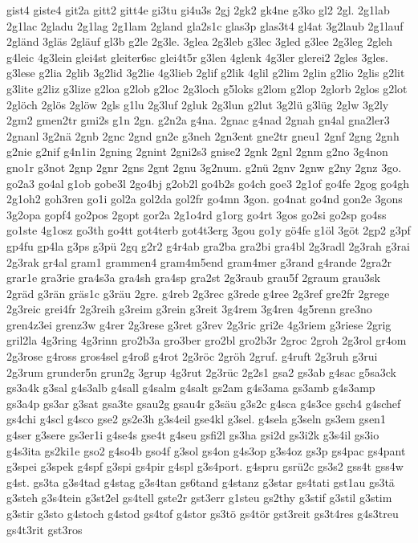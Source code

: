 {gist4
giste4
git2a
gitt2
gitt4e
gi3tu
gi4u3s
2gj
2gk2
gk4ne
g3ko
gl2
2gl.
2g1lab
2g1lac
2gladu
2g1lag
2g1lam
2gland
gla2s1c
glas3p
glas3t4
gl4at
3g2laub
2g1lauf
2gländ
3gläs
2gläuf
gl3b
g2le
2g3le.
3glea
2g3leb
g3lec
3gled
g3lee
2g3leg
2gleh
g4leic
4g3lein
glei4st
gleiter6sc
glei4t5r
g3len
4glenk
4g3ler
glerei2
2gles
3gles.
g3lese
g2lia
2glib
3g2lid
3g2lie
4g3lieb
2glif
g2lik
4glil
g2lim
2glin
g2lio
2glis
g2lit
g3lite
g2liz
g3lize
g2loa
g2lob
g2loc
2g3loch
g5loks
g2lom
g2lop
2glorb
2glos
g2lot
2glöch
2glös
2glöw
2gls
g1lu
2g3luf
2gluk
2g3lun
g2lut
3g2lü
g3lüg
2glw
3g2ly
2gm2
gmen2tr
gmi2s
g1n
2gn.
g2n2a
g4na.
2gnac
g4nad
2gnah
gn4al
gna2ler3
2gnanl
3g2nä
2gnb
2gnc
2gnd
gn2e
g3neh
2gn3ent
gne2tr
gneu1
2gnf
2gng
2gnh
g2nie
g2nif
g4n1in
2gning
2gnint
2gni2s3
gnise2
2gnk
2gnl
2gnm
g2no
3g4non
gno1r
g3not
2gnp
2gnr
2gns
2gnt
2gnu
3g2num.
g2nü
2gnv
2gnw
g2ny
2gnz
3go.
go2a3
go4al
g1ob
gobe3l
2go4bj
g2ob2l
go4b2s
go4ch
goe3
2g1of
go4fe
2gog
go4gh
2g1oh2
goh3ren
go1i
gol2a
gol2da
gol2fr
go4mn
3gon.
go4nat
go4nd
gon2e
3gons
3g2opa
gopf4
go2pos
2gopt
gor2a
2g1o4rd
g1org
go4rt
3gos
go2si
go2sp
go4ss
go1ste
4g1osz
go3th
go4tt
got4terb
got4t3erg
3gou
go1y
gö4fe
g1öl
3göt
2gp2
g3pf
gp4fu
gp4la
g3ps
g3pü
2gq
g2r2
g4r4ab
gra2ba
gra2bi
gra4bl
2g3radl
2g3rah
g3rai
2g3rak
gr4al
gram1
grammen4
gram4m5end
gram4mer
g3rand
g4rande
2gra2r
grar1e
gra3rie
gra4s3a
gra4sh
gra4sp
gra2st
2g3raub
grau5f
2graum
grau3sk
2gräd
g3rän
gräs1c
g3räu
2gre.
g4reb
2g3rec
g3rede
g4ree
2g3ref
gre2fr
2grege
2g3reic
grei4fr
2g3reih
g3reim
g3rein
g3reit
3g4rem
3g4ren
4g5renn
gre3no
gren4z3ei
grenz3w
g4rer
2g3rese
g3ret
g3rev
2g3ric
gri2e
4g3riem
g3riese
2grig
gril2la
4g3ring
4g3rinn
gro2b3a
gro3ber
gro2bl
gro2b3r
2groc
2groh
2g3rol
gr4om
2g3rose
g4ross
gros4sel
g4roß
g4rot
2g3röc
2gröh
2gruf.
g4ruft
2g3ruh
g3rui
2g3rum
grunder5n
grun2g
3grup
4g3rut
2g3rüc
2g2s1
gsa2
gs3ab
g4sac
g5sa3ck
gs3a4k
g3sal
g4s3alb
g4sall
g4salm
g4salt
gs2am
g4s3ama
gs3amb
g4s3amp
gs3a4p
gs3ar
g3sat
gsa3te
gsau2g
gsau4r
g3säu
g3s2c
g4sca
g4s3ce
gsch4
g4schef
gs4chi
g4scl
g4sco
gse2
gs2e3h
g3s4eil
gse4kl
g3sel.
g4sela
g3seln
gs3em
gsen1
g4ser
g3sere
gs3er1i
g4se4s
gse4t
g4seu
gsfi2l
gs3ha
gsi2d
gs3i2k
g3s4il
gs3io
g4s3ita
gs2ki1e
gso2
g4so4b
gso4f
g3sol
gs4on
g4s3op
g3s4oz
gs3p
gs4pac
gs4pant
g3spei
g3spek
g4spf
g3spi
gs4pir
g4spl
g3s4port.
g4spru
gsrü2c
gs3s2
gss4t
gss4w
g4st.
gs3ta
g3s4tad
g4stag
g3s4tan
gs6tand
g4stanz
g3star
gs4tati
gst1au
gs3tä
g3steh
g3s4tein
g3st2el
gs4tell
gste2r
gst3err
g1steu
gs2thy
g3stif
g3stil
g3stim
g3stir
g3sto
g4stoch
g4stod
gs4tof
g4stor
gs3tö
gs4tör
gst3reit
gs3t4res
g4s3treu
gs4t3rit
gst3ros
}
